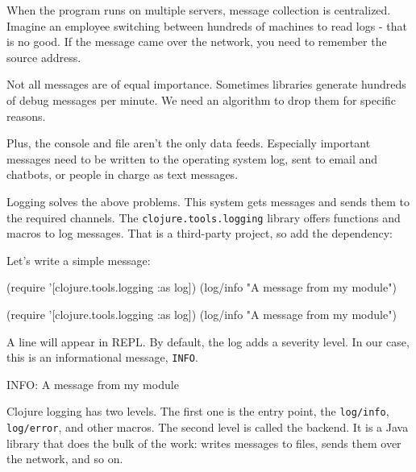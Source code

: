 When the program runs on multiple servers, message collection is centralized. Imagine an employee switching between hundreds of machines to read logs - that is no good. If the message came over the network, you need to remember the source address.

Not all messages are of equal importance. Sometimes libraries generate hundreds of debug messages per minute. We need an algorithm to drop them for specific reasons.

Plus, the console and file aren't the only data feeds. Especially important messages need to be written to the operating system log, sent to email and chatbots, or people in charge as text messages.

Logging solves the above problems. This system gets messages and sends them to the required channels. The \verb|clojure.tools.logging| library offers functions and macros to log messages. That is a third-party project, so add the dependency:


\begin{clojure}
\end{clojure}

\noindent
Let's write a simple message:

\ifx\DEVICETYPE\MOBILE

\begin{clojure}
(require
  '[clojure.tools.logging :as log])
(log/info "A message from my module")
\end{clojure}

\else

\begin{clojure}
(require '[clojure.tools.logging :as log])
(log/info "A message from my module")
\end{clojure}

\fi

\noindent
A line will appear in REPL. By default, the log adds a severity level. In our case, this is an informational message, \verb|INFO|.

\begin{text}
INFO: A message from my module
\end{text}

Clojure logging has two levels. The first one is the entry point, the \verb|log/info|, \verb|log/error|, and other macros. The second level is called the backend. It is a Java library that does the bulk of the work: writes messages to files, sends them over the network, and so on.

